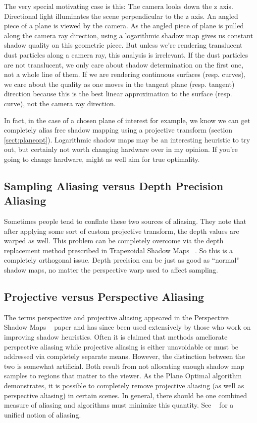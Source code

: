 \documentclass[]{article}  %
\begin{document}
The very special motivating case is this:  The camera looks down the z axis.  Directional light illuminates the scene perpendicular to the z axis.  An angled piece of a plane is viewed by the camera.  As the angled piece of plane is pulled along the camera ray direction, using a logarithmic shadow map gives us constant shadow quality on this geometric piece.  But unless we're rendering translucent dust particles along a camera ray, this analysis is irrelevant.  If the dust particles are not translucent, we only care about shadow determination on the first one, not a whole line of them.  If we are rendering continuous surfaces (resp. curves), we care about the quality as one moves in the tangent plane (resp. tangent) direction because this is the best linear approximation to the surface (resp. curve), not the camera ray direction.  

In fact, in the case of a chosen plane of interest for example, we know we can get completely alias free shadow mapping using a projective transform (section \ref{sect:planeopt}).  Logarithmic shadow maps may be an interesting heuristic to try out, but certainly not worth changing hardware over in my opinion.  If you're going to change hardware, might as well aim for true optimality.  

\subsection{Sampling Aliasing versus Depth Precision Aliasing}
Sometimes people tend to conflate these two sources of aliasing.  They note that after applying some sort of custom projective transform, the depth values are warped as well.  This problem can be completely overcome via the depth replacement method prescribed in Trapezoidal Shadow Maps ~\cite{MT04}.  So this is a completely orthogonal issue.  Depth precision can be just as good as ``normal'' shadow maps, no matter the perspective warp used to affect sampling.  

\subsection{Projective versus Perspective Aliasing}
The terms perspective and projective aliasing appeared in the Perspective Shadow Maps ~\cite{SD02} paper and has since been used extensively by those who work on improving shadow heuristics.  Often it is claimed that methods ameliorate perspective aliasing while projective aliasing is either unavoidable or must be addressed via completely separate means.  However, the distinction between the two is somewhat artificial.  Both result from not allocating enough shadow map samples to regions that matter to the viewer.  As the Plane Optimal algorithm demonstrates, it is possible to completely remove projective aliasing (as well as perspective aliasing) in certain scenes.  In general, there should be one combined measure of aliasing and algorithms must minimize this quantity.  See ~\cite{Chong06} for a unified notion of aliasing.  
\end{document}
